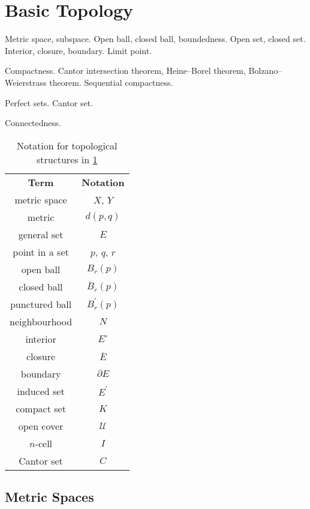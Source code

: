 \chapter{Basic Topology}\label{chap:basic-topology}
\begin{summary}
\item Metric space, subspace. Open ball, closed ball, boundedness. Open set, closed set. Interior, closure, boundary. Limit point.  
\item Compactness. Cantor intersection theorem, Heine--Borel theorem, Bolzano--Weierstrass theorem. Sequential compactness.
\item Perfect sets. Cantor set.
\item Connectedness.
\end{summary}

\begin{table}[H]
\centering
\begin{tabular}{cc}
\textbf{Term} & \textbf{Notation}\\
metric space & $X$, $Y$\\
metric & $d(p,q)$\\
general set & $E$\\
point in a set & $p$, $q$, $r$\\
open ball & $B_r(p)$\\
closed ball & $\overline{B}_r(p)$\\
punctured ball & $B_r^\prime(p)$\\
neighbourhood & $N$\\
interior & $E^\circ$\\
closure & $\overline{E}$\\
boundary & $\partial E$\\
induced set & $E^\prime$\\
compact set & $K$\\
open cover & $\mathcal{U}$\\
$n$-cell & $I$\\
Cantor set & $C$
\end{tabular}
\caption{Notation for topological structures in \cref{chap:basic-topology}}
\end{table}
\pagebreak

\section{Metric Spaces}
